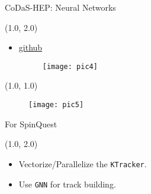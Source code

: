 \documentclass[10pt, xcolor={dvipsnames}, aspectratio = 169]{beamer}
\begin{document}
	\begin{frame}[fragile]{CoDaS-HEP: Neural Networks}
		\begin{textblock}{14.0}(1.0, 2.0)
			\begin{itemize}
				\item \href{https://github.com/savvy379/codashep_ml_2022}{github}
				\begin{figure}
					\centering
					\texttt{[image: pic4]}
				\end{figure}
			\end{itemize}
		\end{textblock}
	\end{frame}

	\begin{frame}
		\begin{textblock}{12.0}(1.0, 1.0)
			\begin{figure}
					\centering
					\texttt{[image: pic5]}
				\end{figure}
		\end{textblock}
	\end{frame}

	\begin{frame}[fragile]{For SpinQuest}
		\begin{textblock}{14.0}(1.0, 2.0)
			\begin{itemize}
				\item Vectorize/Parallelize the \verb|KTracker|.
				\item Use \verb|GNN| for track building.
			\end{itemize}
		\end{textblock}
	\end{frame}
\end{document}
